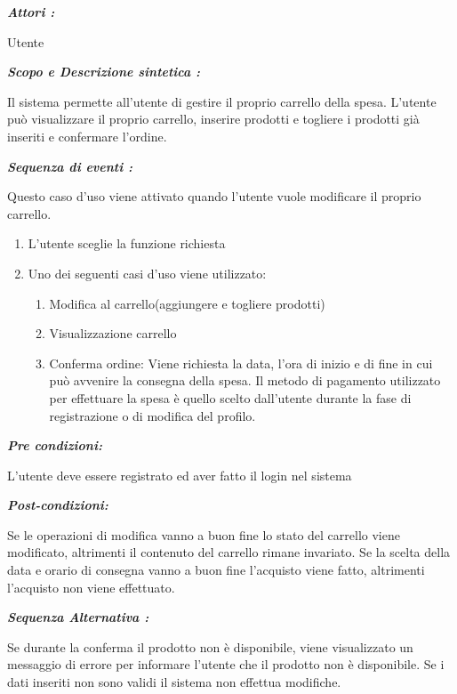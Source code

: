 \documentclass{article}
\begin{document}
\newpage
\begin{mdframed}

	\noindent\textit{\textbf{Attori :}}


	Utente

	\noindent\textit{\textbf{Scopo e Descrizione sintetica :}}


	Il sistema permette all’utente di gestire il proprio carrello della spesa.
	L’utente può visualizzare il proprio carrello,
	inserire prodotti e togliere i prodotti già inseriti e confermare l’ordine.

	\noindent\textit{\textbf{Sequenza di eventi :}}


	\hspace{\parindent} Questo caso d’uso viene attivato quando l’utente vuole modificare il proprio carrello.
	\begin{enumerate}
		\item L’utente sceglie la funzione richiesta
		\item Uno dei seguenti casi d’uso viene utilizzato:
		      \begin{enumerate}
			      \item Modifica al carrello(aggiungere e togliere prodotti)
			      \item Visualizzazione carrello
			      \item Conferma ordine:
			            Viene richiesta la data, l'ora di inizio e  di fine in cui può avvenire la consegna della spesa.
			            Il metodo di pagamento utilizzato per effettuare la spesa è quello scelto dall'utente durante la fase di registrazione o di modifica del profilo.
		      \end{enumerate}
	\end{enumerate}

	\noindent\textit{\textbf{Pre condizioni:}}


	L’utente deve essere registrato ed aver fatto il login 	nel sistema

	\noindent\textit{\textbf{Post-condizioni:}}


	Se le operazioni di modifica vanno a buon fine lo stato del carrello viene modificato,
	altrimenti il contenuto del carrello rimane invariato.
	Se la scelta della data e orario di consegna vanno a buon fine l’acquisto viene fatto, altrimenti l’acquisto
	non viene effettuato.

	\noindent\textit{\textbf{Sequenza Alternativa :}}


	Se durante la conferma il prodotto non è disponibile, viene visualizzato un
	messaggio di errore per informare l’utente che il prodotto non è disponibile.
	Se i dati inseriti non sono validi il sistema non effettua modifiche.
\end{mdframed}
\end{document}
